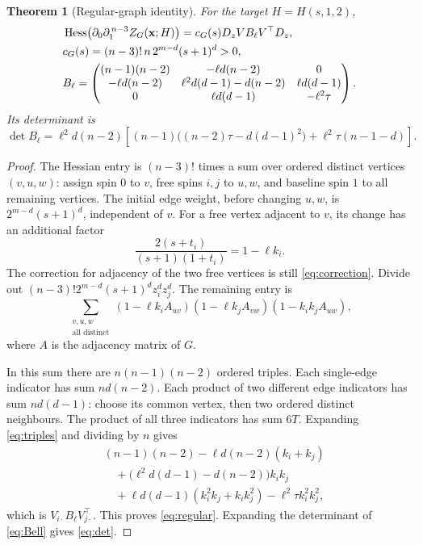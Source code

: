 \documentclass[11pt]{article}
\newtheorem{theorem}{Theorem}
\theoremstyle{remark}
\DeclareMathOperator{\Hess}{Hess}
\newcommand{\dd}{\partial}
\begin{document}
\begin{theorem}[Regular-graph identity]\label{thm:regular}
For the target $H=H(s,1,2)$,
\begin{align}
 &\Hess\bigl(\dd_0\dd_1^{\,n-3}Z_G(\mathbf x;H)\bigr)
       =c_G(s)D_z V B_\ell V^\top D_z,               \label{eq:regular}\\
 &c_G(s)=(n-3)!\,n\,2^{m-d}(s+1)^d>0, \notag\\
 &B_\ell=
 \begin{pmatrix}
 (n-1)(n-2)&-\ell d(n-2)&0\\
 -\ell d(n-2)&\ell^2d(d-1)-d(n-2)&\ell d(d-1)\\
 0&\ell d(d-1)&-\ell^2\tau
 \end{pmatrix}.                                     \label{eq:Bell}
\end{align}
Its determinant is
\begin{equation}
 \det B_\ell=\ell^2d(n-2)
 \left[(n-1)\bigl((n-2)\tau-d(d-1)^2\bigr)
              +\ell^2\tau(n-1-d)\right].             \label{eq:det}
\end{equation}
\end{theorem}
\begin{proof}
The Hessian entry is $(n-3)!$ times a sum over ordered distinct
vertices $(v,u,w)$: assign spin $0$ to $v$, free spins $i,j$ to
$u,w$, and baseline spin $1$ to all remaining vertices.
The initial edge weight, before changing $u,w$, is
$2^{m-d}(s+1)^d$, independent of $v$.
For a free vertex adjacent to $v$, its change has an additional factor
\[
 \frac{2(s+t_i)}{(s+1)(1+t_i)}=1-\ell k_i.
\]
The correction for adjacency of the two free vertices is still
\eqref{eq:correction}. Divide out
$(n-3)!2^{m-d}(s+1)^d z_i^d z_j^d$.
The remaining entry is
\begin{equation}
 \sum_{\substack{v,u,w\\\text{all distinct}}}
 (1-\ell k_i A_{uv})(1-\ell k_j A_{vw})
                         (1-k_i k_j A_{uw}),         \label{eq:triples}
\end{equation}
where $A$ is the adjacency matrix of $G$.

In this sum there are $n(n-1)(n-2)$ ordered triples.
Each single-edge indicator has sum $nd(n-2)$.
Each product of two different edge indicators has sum $nd(d-1)$:
choose its common vertex, then two ordered distinct neighbours.
The product of all three indicators has sum $6T$.
Expanding \eqref{eq:triples} and dividing by $n$ gives
\[
 \begin{split}
 &(n-1)(n-2)-\ell d(n-2)(k_i+k_j)\\
 &\quad+\bigl(\ell^2d(d-1)-d(n-2)\bigr)k_i k_j\\
 &\quad+\ell d(d-1)(k_i^2k_j+k_ik_j^2)
                         -\ell^2\tau k_i^2k_j^2,
 \end{split}
\]
which is $V_{i\cdot}B_\ell V_{j\cdot}^{\top}$.
This proves \eqref{eq:regular}. Expanding the determinant of
\eqref{eq:Bell} gives \eqref{eq:det}.
\end{proof}
\end{document}
